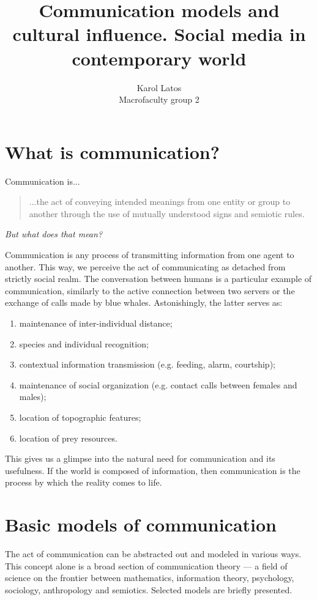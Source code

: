\documentclass[12pt]{article}
\title{\vspace{-3em} Communication models and cultural influence. Social media in contemporary world}
\author{Karol Latos\\Macrofaculty group 2}
\date{}
\begin{document}
\maketitle

\section{What is communication?} \noindent
Communication is...

\begin{quotation}
...the act of conveying intended meanings
from one entity or group to another through
the use of mutually understood signs and
semiotic rules.
\end{quotation}

\textit{But what does that mean? \vspace{+0.5em}} \par

Communication is any process of transmitting information from one agent to another. This way, we perceive the act of communicating as detached from strictly social realm. The conversation between humans is a particular example of communication, similarly to the active connection between two servers or the exchange of calls made by blue whales. Astonishingly, the latter serves as:

\begin{enumerate}
\setlength\itemsep{0.3em}
\item{maintenance of inter-individual distance;}
\item{species and individual recognition;}
\item{contextual information transmission (e.g. feeding, alarm, courtship);}
\item{maintenance of social organization (e.g. contact calls between females and males);}
\item{location of topographic features;}
\item{location of prey resources.\cite{whales}}
\end{enumerate} \par

This gives us a glimpse into the natural need for communication and its usefulness. If the world is composed of information, then communication is the process by which the reality comes to life.

\section{Basic models of communication}
The act of communication can be abstracted out and modeled in various ways. This concept alone is a broad section of communication theory --- a field of science on the frontier between mathematics, information theory, psychology, sociology, anthropology and semiotics. Selected models are briefly presented.
\end{document}
